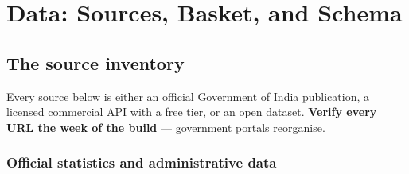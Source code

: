 \chapter{Data: Sources, Basket, and Schema}

\section{The source inventory}

Every source below is either an official Government of India publication, a licensed
commercial API with a free tier, or an open dataset. \textbf{Verify every URL the week of
the build} --- government portals reorganise.

\subsection{Official statistics and administrative data}

